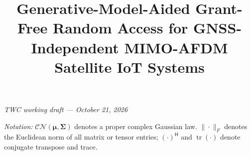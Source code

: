 \documentclass[10pt,journal,onecolumn]{IEEEtran}
\title{Generative-Model-Aided Grant-Free Random Access for GNSS-Independent MIMO-AFDM Satellite IoT Systems}
\author{}
\newcommand{\CN}{\mathcal{CN}}
\newcommand{\tr}{\operatorname{tr}}
\begin{document}
\maketitle
\begin{center}
\small\textit{TWC working draft --- October 21, 2026}
\end{center}



\noindent\textit{Notation:} $\CN(\bm\mu,\bm\Sigma)$ denotes a proper complex Gaussian law.
$\|\cdot\|_F$ denotes the Euclidean norm of all matrix or tensor entries;
$(\cdot)^{\mathsf H}$ and $\tr(\cdot)$ denote conjugate transpose and trace.





% 
% 

\appendices
{}




\end{document}
